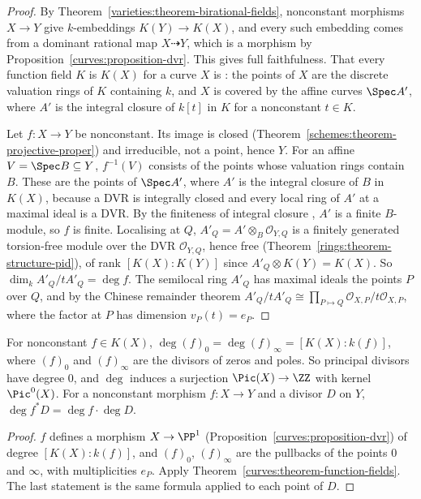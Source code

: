\begin{proof}
By Theorem~\ref{varieties:theorem-birational-fields}, nonconstant morphisms $X \to Y$ give $k$-embeddings $K(Y) \to K(X)$, and every such embedding comes from a
dominant rational map $X \dashrightarrow Y$, which is a morphism by Proposition~\ref{curves:proposition-dvr}. This gives full faithfulness. That every function field $K$ is
$K(X)$ for a curve $X$ is \cite[Theorem I.6.9]{hartshorne-ag}: the points of $X$ are the discrete valuation rings of $K$ containing $k$, and $X$ is covered by the affine curves
$\Spec A'$, where $A'$ is the integral closure of $k[t]$ in $K$ for a nonconstant $t \in K$.

Let $f \colon X \to Y$ be nonconstant. Its image is closed (Theorem~\ref{schemes:theorem-projective-proper}) and irreducible, not a point, hence $Y$. For an affine
$V = \Spec B \subseteq Y$, $f^{-1}(V)$ consists of the points whose valuation rings contain $B$. These are the points of $\Spec A'$, where $A'$ is the integral closure of $B$
in $K(X)$, because a DVR is integrally closed and every local ring of $A'$ at a maximal ideal is a DVR. By the finiteness of integral closure \cite[Theorem I.3.9A]{hartshorne-ag},
$A'$ is a finite $B$-module, so $f$ is finite. Localising at $Q$, $A'_Q = A' \otimes_B\mathcal{O}_{Y,Q}$ is a finitely generated torsion-free module over the DVR
$\mathcal{O}_{Y,Q}$, hence free (Theorem~\ref{rings:theorem-structure-pid}), of rank $[K(X) : K(Y)]$ since $A'_Q \otimes K(Y) = K(X)$. So
$\dim_kA'_Q/tA'_Q = \deg f$. The semilocal ring $A'_Q$ has maximal ideals the points $P$ over $Q$, and by the Chinese remainder theorem
$A'_Q/tA'_Q \cong \prod_{P \mapsto Q}\mathcal{O}_{X,P}/t\mathcal{O}_{X,P}$, where the factor at $P$ has dimension $v_P(t) = e_P$.
\end{proof}

\begin{corollary}\label{curves:corollary-degree-principal}
For nonconstant $f \in K(X)$, $\deg(f)_0 = \deg(f)_\infty = [K(X) : k(f)]$, where $(f)_0$ and $(f)_\infty$ are the divisors of zeros and poles. So principal divisors have
degree $0$, and $\deg$ induces a surjection $\Pic(X) \to \ZZ$ with kernel $\Pic^0(X)$. For a nonconstant morphism $f \colon X \to Y$ and a divisor $D$ on $Y$,
$\deg f^*D = \deg f \cdot \deg D$.
\end{corollary}

\begin{proof}
$f$ defines a morphism $X \to \PP^1$ (Proposition~\ref{curves:proposition-dvr}) of degree $[K(X) : k(f)]$, and $(f)_0$, $(f)_\infty$ are the pullbacks of the points $0$ and
$\infty$, with multiplicities $e_P$. Apply Theorem~\ref{curves:theorem-function-fields}. The last statement is the same formula applied to each point of $D$.
\end{proof}

